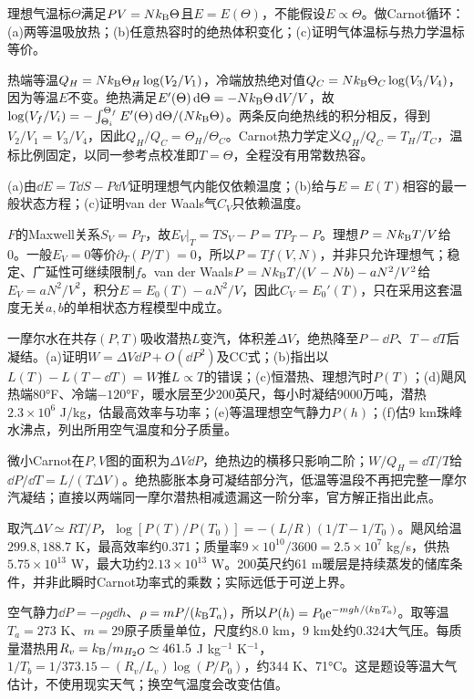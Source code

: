 \begin{exercise}[原题3(a)--(c)]\label{r:333-1-3}
理想气温标$\Theta$满足$PV=Nk_{\mathrm B}\Theta$且$E=E(\Theta)$，不能假设$E\propto\Theta$。做Carnot循环：(a)两等温吸放热；(b)任意热容时的绝热体积变化；(c)证明气体温标与热力学温标等价。
\end{exercise}
\begin{solution}
热端等温$Q_H=Nk_{\mathrm B}\Theta_H\log(V_2/V_1)$，冷端放热绝对值$Q_C=Nk_{\mathrm B}\Theta_C\log(V_3/V_4)$，因为等温$E$不变。绝热满足$E'(\Theta)\,\mathrm d\Theta=-Nk_{\mathrm B}\Theta\,\mathrm d V/V$，故$\log(V_f/V_i)=-\int_{\Theta_i}^{\Theta_f}E'(\Theta)\,\mathrm d\Theta/(Nk_{\mathrm B}\Theta)$。两条反向绝热线的积分相反，得到$V_2/V_1=V_3/V_4$，因此$Q_H/Q_C=\Theta_H/\Theta_C$。Carnot热力学定义$Q_H/Q_C=T_H/T_C$，温标比例固定，以同一参考点校准即$T=\Theta$，全程没有用常数热容。
\end{solution}
\begin{exercise}[原题4(a)--(c)]\label{r:333-1-4}
(a)由$\dd E=T\dd S-P\dd V$证明理想气内能仅依赖温度；(b)给与$E=E(T)$相容的最一般状态方程；(c)证明van der Waals气$C_V$只依赖温度。
\end{exercise}
\begin{solution}
$F$的Maxwell关系$S_V=P_T$，故$E_V|_T=TS_V-P=TP_T-P$。理想$P=Nk_{\mathrm B} T/V$给0。一般$E_V=0$等价$\partial_T(P/T)=0$，所以$P=T f(V,N)$，并非只允许理想气；稳定、广延性可继续限制$f$。van der Waals$P=Nk_{\mathrm B} T/(V-Nb)-aN^2/V^2$给$E_V=aN^2/V^2$，积分$E=E_0(T)-aN^2/V$，因此$C_V=E_0'(T)$，只在采用这套温度无关$a,b$的单相状态方程模型中成立。
\end{solution}
\begin{exercise}[原题5(a)--(f)]\label{r:333-1-5}
一摩尔水在共存$(P,T)$吸收潜热$L$变汽，体积差$\Delta V$，绝热降至$P-\dd P$、$T-\dd T$后凝结。(a)证明$W=\Delta V\dd P+O(\dd P^2)$及CC式；(b)指出以$L(T)-L(T-\dd T)=W$推$L\propto T$的错误；(c)恒潜热、理想汽时$P(T)$；(d)飓风热端80°F、冷端$-120$°F，暖水层至少200英尺，每小时凝结9000万吨，潜热$2.3\times10^6$ J/kg，估最高效率与功率；(e)等温理想空气静力$P(h)$；(f)估9 km珠峰水沸点，列出所用空气温度和分子质量。
\end{exercise}
\begin{solution}
微小Carnot在$P,V$图的面积为$\Delta V\dd P$，绝热边的横移只影响二阶；$W/Q_H=\dd T/T$给$\dd P/\dd T=L/(T\Delta V)$。绝热膨胀本身可凝结部分汽，低温等温段不再把完整一摩尔汽凝结；直接以两端同一摩尔潜热相减遗漏这一阶分率，官方解正指出此点。

取汽$\Delta V\simeq RT/P$，$\log[P(T)/P(T_0)]=-(L/R)(1/T-1/T_0)$。飓风给温$299.8,188.7$ K，最高效率约0.371；质量率$9\times10^{10}/3600=2.5\times10^7$ kg/s，供热$5.75\times10^{13}$ W，最大功约$2.13\times10^{13}$ W。200英尺约61 m暖层是持续蒸发的储库条件，并非此瞬时Carnot功率式的乘数；实际远低于可逆上界。

空气静力$\dd P=-\rho g\dd h$、$\rho=mP/(k_{\mathrm B} T_a)$，所以$P(h)=P_0\mathrm e^{-mgh/(k_{\mathrm B} T_a)}$。取等温$T_a=273$ K、$m=29$原子质量单位，尺度约8.0 km，9 km处约0.324大气压。每质量潜热用$R_v=k_{\mathrm B}/m_{H_2O}\simeq461.5$ J kg$^{-1}$ K$^{-1}$，$1/T_b=1/373.15-(R_v/L_v)\log(P/P_0)$，约344 K、71°C。这是题设等温大气估计，不使用现实天气；换空气温度会改变估值。
\end{solution}
